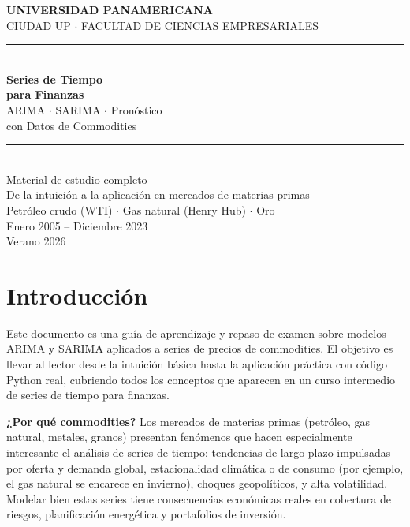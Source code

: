 \documentclass[12pt,a4paper]{article}
\theoremstyle{definition}
\begin{document}
\begin{titlepage}
  \centering
  \vspace*{2cm}
  {\large\textbf{UNIVERSIDAD PANAMERICANA}\\
  CIUDAD UP $\cdot$ FACULTAD DE CIENCIAS EMPRESARIALES}\\[1cm]
  \rule{\linewidth}{1pt}\\[0.5cm]
  {\Huge\bfseries Series de Tiempo\\para Finanzas}\\[0.4cm]
  {\Large ARIMA $\cdot$ SARIMA $\cdot$ Pronóstico\\con Datos de Commodities}\\[0.3cm]
  \rule{\linewidth}{1pt}\\[1cm]
  {\large Material de estudio completo}\\
  {\normalsize De la intuición a la aplicación en mercados de materias primas}\\[2cm]
  {\normalsize Petróleo crudo (WTI) $\cdot$ Gas natural (Henry Hub) $\cdot$ Oro}\\[1cm]
  {\normalsize Enero 2005 -- Diciembre 2023}\\[3cm]
  {\large Verano 2026}
\end{titlepage}

\tableofcontents
\newpage

\section{Introducción}

Este documento es una guía de aprendizaje y repaso de examen sobre modelos
ARIMA y SARIMA aplicados a series de precios de commodities. El objetivo es
llevar al lector desde la intuición básica hasta la aplicación práctica con código
Python real, cubriendo todos los conceptos que aparecen en un curso intermedio
de series de tiempo para finanzas.

\medskip
\noindent\textbf{¿Por qué commodities?} Los mercados de materias primas
(petróleo, gas natural, metales, granos) presentan fenómenos que hacen especialmente interesante el análisis de series de tiempo: tendencias de largo plazo
impulsadas por oferta y demanda global, estacionalidad climática o de consumo
(por ejemplo, el gas natural se encarece en invierno), choques geopolíticos, y
alta volatilidad. Modelar bien estas series tiene consecuencias económicas reales
en cobertura de riesgos, planificación energética y portafolios de inversión.
\end{document}
